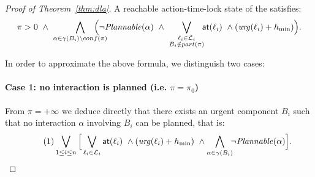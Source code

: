 \begin{proof}[Proof of Theorem~\ref{thm:dla}]
A reachable action-time-lock state of the \lpsabr satisfies:
\begin{displaymath}
  \pi>0 \ \wedge \ \bigwedge_{\substack{\alpha \in \gamma(B_i) \setminus conf(\pi)}} 
  \hspace*{-4ex} \Big(\neg\plntxt{\alpha} \ \wedge \ \bigvee_{\substack{\loc_i \in \Loc_i \\ 
  B_i \notin \p{\pi}}} \hspace*{-1ex} \al{\loc_i} \ \wedge(\urg(\loc_i) + \hmin)\Big).
\end{displaymath}

In order to approximate the above formula, we distinguish two cases:
\paragraph*{Case 1: no interaction is planned (i.e. $\pi = \pi_0$)\\}
From $\pi = +\infty$ we deduce directly that there exists an urgent component $B_i$ 
such that no interaction $\alpha$
involving $B_i$ can be planned, that is:
\begin{equation}
\label{eq:case1}\tag{1}
\bigvee_{\substack{1\le i\le n}}\Big[\bigvee_{\ell_i \in \mathcal{L}_i}\textsf{at}(\ell_i)\ \wedge(\textnormal{\textit{urg}}(\ell_i)
  +h_{\min}) \ \wedge\bigwedge_{\substack{\alpha \in \gamma(B_i)}} \hspace*{-1ex}\neg\mathit{Plannable(\alpha)}
  \Big].
\end{equation}


\end{proof}
